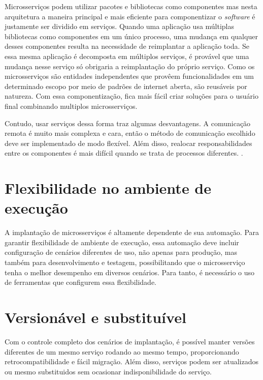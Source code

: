 Microsserviços podem utilizar pacotes e bibliotecas como componentes mas nesta arquitetura a maneira principal e mais eficiente para componentizar o \emph{software} é justamente ser dividido em serviços. Quando uma aplicação usa múltiplas bibliotecas como componentes em um único processo, uma mudança em qualquer desses componentes resulta na necessidade de reimplantar a aplicação toda. Se essa mesma aplicação é decomposta em múltiplos serviços, é provável que uma mudança nesse serviço só obrigaria a reimplantação do próprio serviço. Como os microsserviços são entidades independentes que provêem funcionalidades em um determinado escopo por meio de padrões de internet aberta, são reusáveis por natureza. Com essa componentização, fica mais fácil criar soluções para o usuário final combinando multiplos microsserviços. \cite{martin-fowler-microservices,Familiar2015}

Contudo, usar serviços dessa forma traz algumas desvantagens. A comunicação remota é muito mais complexa e cara, então o método de comunicação escolhido deve ser implementado de modo flexível. Além disso, realocar responsabilidades entre os componentes é mais difícil quando se trata de processos diferentes. \cite{martin-fowler-microservices}.

\section{Flexibilidade no ambiente de execução}

A implantação de microsserviços é altamente dependente de sua automação. Para garantir flexibilidade de ambiente de execução, essa automação deve incluir configuração de cenários diferentes de uso, não apenas para produção, mas também para desenvolvimento e testagem, possibilitando que o microsserviço tenha o melhor desempenho em diversos cenários. Para tanto, é necessário o uso de ferramentas que configurem essa flexibilidade. \cite{Familiar2015}

\section{Versionável e substituível}

Com o controle completo dos cenários de implantação, é possível manter versões diferentes de um mesmo serviço rodando ao mesmo tempo, proporcionando retrocompatibilidade e fácil migração. Além disso, serviços podem ser atualizados ou mesmo substituidos sem ocasionar indisponibilidade do serviço. \cite{Familiar2015}

